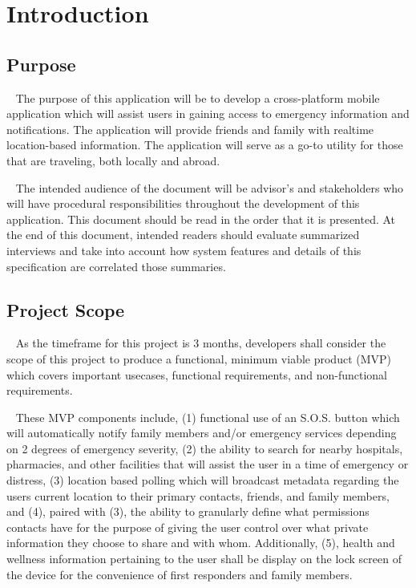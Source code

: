 \documentclass{scrreprt}
\begin{document}
\chapter{Introduction}


\section{Purpose}
\par ~ The purpose of this application will be to develop a cross-platform mobile application which will assist users in gaining access to emergency information and notifications. The application will provide friends and family with realtime location-based information. The application will serve as a go-to utility for those that are traveling, both locally and abroad.
\par ~ The intended audience of the document will be advisor's and stakeholders who will have procedural responsibilities throughout the development of this application. This document should be read in the order that it is presented. At the end of this document, intended readers should evaluate summarized interviews and take into account how system features and details of this specification are correlated those summaries.


\section{Project Scope}
\par ~ As the timeframe for this project is 3 months, developers shall consider the scope of this project to produce a functional, minimum viable product (MVP) which covers important usecases, functional requirements, and non-functional requirements. 

\par ~ These MVP components include, (1) functional use of an S.O.S. button which will automatically notify family members and/or emergency services depending on 2 degrees of emergency severity, (2) the ability to search for nearby hospitals, pharmacies, and other facilities that will assist the user in a time of emergency or distress, (3) location based polling which will broadcast metadata regarding the users current location to their primary contacts, friends, and family members, and (4), paired with (3), the ability to granularly define what permissions contacts have for the purpose of giving the user control over what private information they choose to share and with whom. Additionally, (5), health and wellness information pertaining to the user shall be display on the lock screen of the device for the convenience of first responders and family members.
\end{document}
